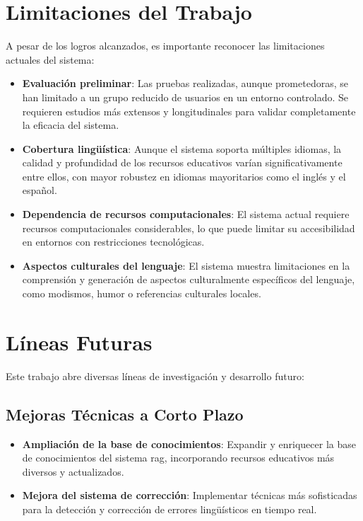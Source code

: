 \section{Limitaciones del Trabajo}
\label{sec:limitaciones}

A pesar de los logros alcanzados, es importante reconocer las limitaciones actuales del sistema:

\begin{itemize}
    \item \textbf{Evaluación preliminar}: Las pruebas realizadas, aunque prometedoras, se han limitado a un grupo reducido de usuarios en un entorno controlado. Se requieren estudios más extensos y longitudinales para validar completamente la eficacia del sistema.
    
    \item \textbf{Cobertura lingüística}: Aunque el sistema soporta múltiples idiomas, la calidad y profundidad de los recursos educativos varían significativamente entre ellos, con mayor robustez en idiomas mayoritarios como el inglés y el español.
    
    \item \textbf{Dependencia de recursos computacionales}: El sistema actual requiere recursos computacionales considerables, lo que puede limitar su accesibilidad en entornos con restricciones tecnológicas.
    
    \item \textbf{Aspectos culturales del lenguaje}: El sistema muestra limitaciones en la comprensión y generación de aspectos culturalmente específicos del lenguaje, como modismos, humor o referencias culturales locales.
\end{itemize}

\section{Líneas Futuras}
\label{sec:lineas-futuras}

Este trabajo abre diversas líneas de investigación y desarrollo futuro:

\subsection{Mejoras Técnicas a Corto Plazo}
\label{subsec:mejoras-corto-plazo}

\begin{itemize}
    \item \textbf{Ampliación de la base de conocimientos}: Expandir y enriquecer la base de conocimientos del sistema \gls{rag}, incorporando recursos educativos más diversos y actualizados.
    
    \item \textbf{Mejora del sistema de corrección}: Implementar técnicas más sofisticadas para la detección y corrección de errores lingüísticos en tiempo real.
\end{itemize}

